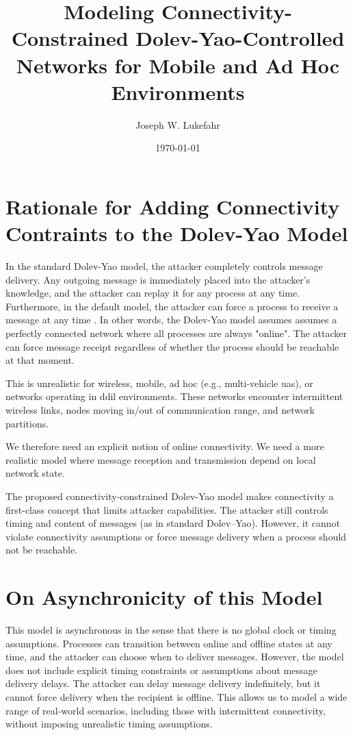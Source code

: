 \documentclass{article}
\title{Modeling Connectivity-Constrained Dolev-Yao-Controlled Networks for Mobile and Ad Hoc Environments}
\author{Joseph W. Lukefahr}
\date{\today}
\begin{document}
\maketitle

\section{Rationale for Adding Connectivity Contraints to the Dolev-Yao Model}

In the standard Dolev-Yao model, the attacker completely controls message delivery.
Any outgoing message is immediately placed into the attacker's knowledge, and the attacker can replay it for any process at any time. 
Furthermore, in the default model, the attacker can force a process to receive a message at any time \cite{Dolev_1983_SecurityPublicKey}.
In other words, the Dolev-Yao model assumes assumes a perfectly connected network where all processes are always "online". 
The attacker can force message receipt regardless of whether the process should be reachable at that moment.

This is unrealistic for wireless, mobile, ad hoc (e.g., multi-vehicle \gls{uas}), or networks operating in \gls{ddil} environments.
These networks encounter intermittent wireless links, nodes moving in/out of communication range, and network partitions.

We therefore need an explicit notion of online connectivity.
We need a more realistic model where message reception and transmission depend on local network state.

The proposed connectivity-constrained Dolev-Yao model makes connectivity a first-class concept that limits attacker capabilities.
The attacker still controls timing and content of messages (as in standard Dolev–Yao).
However, it cannot violate connectivity assumptions or force message delivery when a process should not be reachable.

\section{On Asynchronicity of this Model}

This model is asynchronous in the sense that there is no global clock or timing assumptions.
Processes can transition between online and offline states at any time, and the attacker can choose when to deliver messages.
However, the model does not include explicit timing constraints or assumptions about message delivery delays.
The attacker can delay message delivery indefinitely, but it cannot force delivery when the recipient is offline.
This allows us to model a wide range of real-world scenarios, including those with intermittent connectivity, without imposing unrealistic timing assumptions.
\end{document}

